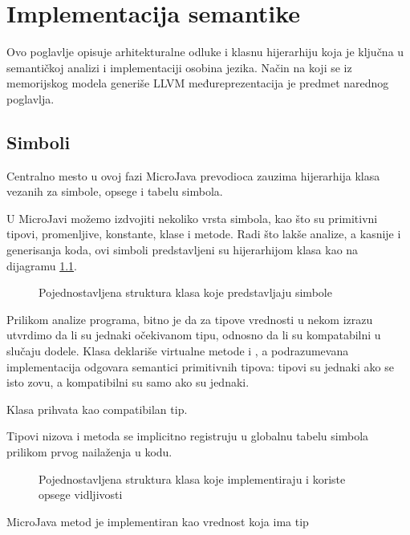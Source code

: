 \chapter{Implementacija semantike}

Ovo poglavlje opisuje arhitekturalne odluke i klasnu hijerarhiju koja je ključna u semantičkoj analizi i implementaciji osobina jezika.
Način na koji se iz memorijskog modela generiše LLVM međureprezentacija je predmet narednog poglavlja.


\section{Simboli}

Centralno mesto u ovoj fazi MicroJava prevodioca zauzima hijerarhija klasa vezanih za simbole, opsege i tabelu simbola.

U MicroJavi možemo izdvojiti nekoliko vrsta simbola, kao što su primitivni tipovi, promenljive, konstante, klase i metode.
Radi što lakše analize, a kasnije i generisanja koda, ovi simboli predstavljeni su hijerarhijom klasa kao na dijagramu \ref{symbols}.

\begin{figure}[h]

	\centering
	
	\caption{Pojednostavljena struktura klasa koje predstavljaju simbole}
	\label{symbols}
\end{figure}

Prilikom analize programa, bitno je da za tipove vrednosti u nekom izrazu utvrdimo da li su jednaki očekivanom tipu, odnosno da li su kompatabilni u slučaju dodele.
Klasa  deklariše virtualne metode  i , a podrazumevana implementacija odgovara semantici primitivnih tipova: tipovi su jednaki ako se isto zovu, a kompatibilni su samo ako su jednaki.

Klasa  prihvata  kao compatibilan tip.

Tipovi nizova i metoda se implicitno registruju u globalnu tabelu simbola prilikom prvog nailaženja u kodu.



\begin{figure}[h]
	\centering
	
	\caption{Pojednostavljena struktura klasa koje implementiraju i koriste opsege vidljivosti}
\end{figure}

MicroJava metod je implementiran kao vrednost koja ima tip 

